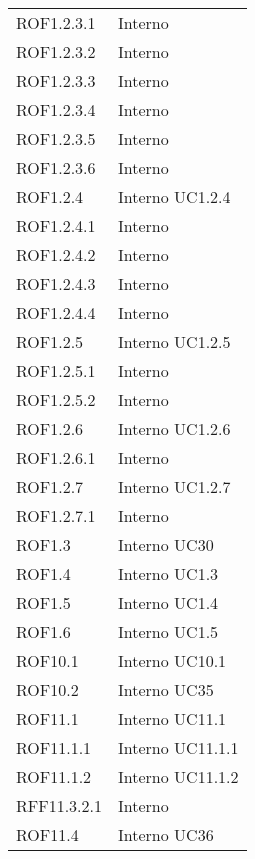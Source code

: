 \begin{longtable}{p{2.5cm}!{\VRule[1pt]}p{2.5cm}}
	ROF1.2.3.1 & Interno \\
	ROF1.2.3.2 & Interno \\
	ROF1.2.3.3 & Interno \\
	ROF1.2.3.4 & Interno \\
	ROF1.2.3.5 & Interno \\
	ROF1.2.3.6 & Interno \\
	ROF1.2.4 & Interno \newline UC1.2.4
	\\
	ROF1.2.4.1 & Interno \\
	ROF1.2.4.2 & Interno \\
	ROF1.2.4.3 & Interno \\
	ROF1.2.4.4 & Interno \\
	ROF1.2.5 & Interno \newline UC1.2.5
	\\
	ROF1.2.5.1 & Interno \\
	ROF1.2.5.2 & Interno \\
	ROF1.2.6 & Interno \newline UC1.2.6
	\\
	ROF1.2.6.1 & Interno \\
	ROF1.2.7 & Interno \newline UC1.2.7
	\\
	ROF1.2.7.1 & Interno \\
	ROF1.3 & Interno \newline UC30
	\\
	ROF1.4 & Interno \newline UC1.3
	\\
	ROF1.5 & Interno \newline UC1.4
	\\
	ROF1.6 & Interno \newline UC1.5
	\\
	ROF10.1 & Interno \newline UC10.1
	\\
	ROF10.2 & Interno \newline UC35
	\\
	ROF11.1 & Interno \newline UC11.1
	\\
	ROF11.1.1 & Interno \newline UC11.1.1
	\\
	ROF11.1.2 & Interno \newline UC11.1.2
	\\
	RFF11.3.2.1 & Interno \\
	ROF11.4 & Interno \newline UC36

\end{longtable}
